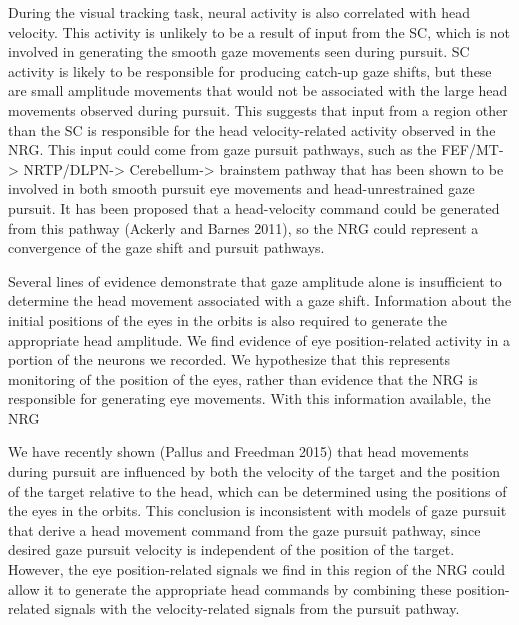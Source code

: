 \documentclass[]{article}
\begin{document}
During the visual tracking task, neural activity is also correlated with
head velocity. This activity is unlikely to be a result of input from
the SC, which is not involved in generating the smooth gaze movements
seen during pursuit. SC activity is likely to be responsible for
producing catch-up gaze shifts, but these are small amplitude movements
that would not be associated with the large head movements observed
during pursuit. This suggests that input from a region other than the SC
is responsible for the head velocity-related activity observed in the
NRG. This input could come from gaze pursuit pathways, such as the
FEF/MT-\textgreater{} NRTP/DLPN-\textgreater{} Cerebellum-\textgreater{}
brainstem pathway that has been shown to be involved in both smooth
pursuit eye movements and head-unrestrained gaze pursuit. It has been
proposed that a head-velocity command could be generated from this
pathway (Ackerly and Barnes 2011), so the NRG could represent a
convergence of the gaze shift and pursuit pathways.

Several lines of evidence demonstrate that gaze amplitude alone is
insufficient to determine the head movement associated with a gaze
shift. Information about the initial positions of the eyes in the orbits
is also required to generate the appropriate head amplitude. We find
evidence of eye position-related activity in a portion of the neurons we
recorded. We hypothesize that this represents monitoring of the position
of the eyes, rather than evidence that the NRG is responsible for
generating eye movements. With this information available, the NRG

We have recently shown (Pallus and Freedman 2015) that head movements
during pursuit are influenced by both the velocity of the target and the
position of the target relative to the head, which can be determined
using the positions of the eyes in the orbits. This conclusion is
inconsistent with models of gaze pursuit that derive a head movement
command from the gaze pursuit pathway, since desired gaze pursuit
velocity is independent of the position of the target. However, the eye
position-related signals we find in this region of the NRG could allow
it to generate the appropriate head commands by combining these
position-related signals with the velocity-related signals from the
pursuit pathway.
\end{document}
